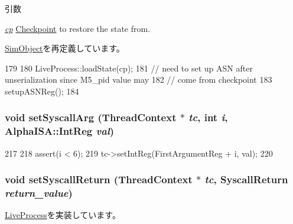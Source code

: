 \begin{DoxyParams}{引数}
\item[{\em \hyperlink{namespacecp}{cp}}]\hyperlink{classCheckpoint}{Checkpoint} to restore the state from. \end{DoxyParams}


\hyperlink{classSimObject_a0c3e6eb311ceff72035b11f2a5e0f186}{SimObject}を再定義しています。


\begin{DoxyCode}
179 {
180     LiveProcess::loadState(cp);
181     // need to set up ASN after unserialization since M5_pid value may
182     // come from checkpoint
183     setupASNReg();
184 }
\end{DoxyCode}
\hypertarget{classAlphaLiveProcess_aeaf2b415297449d001c053d7d0d95586}{
\subsubsection[{setSyscallArg}]{\setlength{\rightskip}{0pt plus 5cm}void setSyscallArg ({\bf ThreadContext} $\ast$ {\em tc}, \/  int {\em i}, \/  {\bf AlphaISA::IntReg} {\em val})}}
\label{classAlphaLiveProcess_aeaf2b415297449d001c053d7d0d95586}



\begin{DoxyCode}
217 {
218     assert(i < 6);
219     tc->setIntReg(FirstArgumentReg + i, val);
220 }
\end{DoxyCode}
\hypertarget{classAlphaLiveProcess_aaefd02663c1eae206b851290d9276a5e}{
\subsubsection[{setSyscallReturn}]{\setlength{\rightskip}{0pt plus 5cm}void setSyscallReturn ({\bf ThreadContext} $\ast$ {\em tc}, \/  {\bf SyscallReturn} {\em return\_\-value})}}
\label{classAlphaLiveProcess_aaefd02663c1eae206b851290d9276a5e}


\hyperlink{classLiveProcess_a5955e790542b86589b9fd75df24ec2d3}{LiveProcess}を実装しています。


